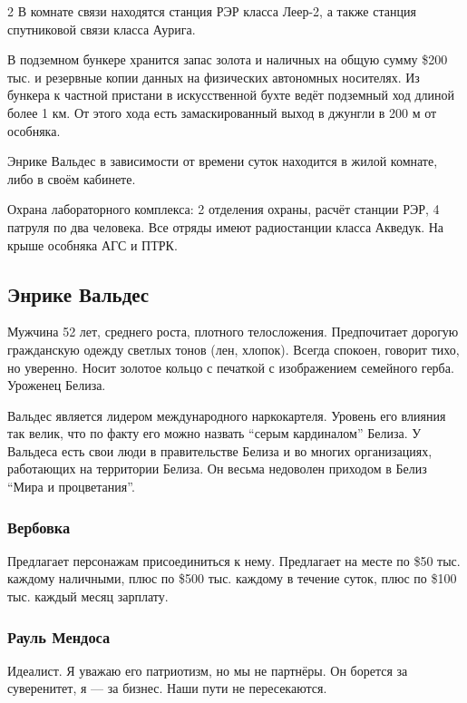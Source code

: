 \documentclass[twoside]{article}
\begin{document}
\begin{multicols}{2}
В комнате связи находятся станция РЭР класса Леер-2, а также станция
спутниковой связи класса Аурига.

В подземном бункере хранится запас золота и наличных на общую сумму
\$200 тыс. и резервные копии данных на физических автономных носителях.
Из бункера к частной пристани в искусственной бухте ведёт подземный ход
длиной более 1 км. От этого хода есть замаскированный выход в джунгли в
200 м от особняка.

Энрике Вальдес в зависимости от времени суток находится в жилой комнате,
либо в своём кабинете.

Охрана лабораторного комплекса: 2 отделения охраны, расчёт станции РЭР,
4 патруля по два человека. Все отряды имеют радиостанции класса Акведук.
На крыше особняка АГС и ПТРК.

\subsection{Энрике Вальдес}\label{enrique-valdes-char}

Мужчина 52 лет, среднего роста, плотного телосложения. Предпочитает
дорогую гражданскую одежду светлых тонов (лен, хлопок). Всегда спокоен,
говорит тихо, но уверенно. Носит золотое кольцо с печаткой с
изображением семейного герба. Уроженец Белиза.

Вальдес является лидером международного наркокартеля. Уровень его
влияния так велик, что по факту его можно назвать \enquote{серым кардиналом}
Белиза. У Вальдеса есть свои люди в правительстве Белиза и во многих
организациях, работающих на территории Белиза. Он весьма недоволен
приходом в Белиз \enquote{Мира и процветания}.

\subsubsection{Вербовка}\label{recruitment-valdes}

Предлагает персонажам присоединиться к нему. Предлагает на месте по \$50
тыс. каждому наличными, плюс по \$500 тыс. каждому в течение суток, плюс
по \$100 тыс. каждый месяц зарплату.

\subsubsection{Рауль Мендоса}\label{raul-mendoza-valdes}

Идеалист. Я уважаю его патриотизм, но мы не партнёры. Он борется за
суверенитет, я --- за бизнес. Наши пути не пересекаются.


\end{multicols}
\end{document}
